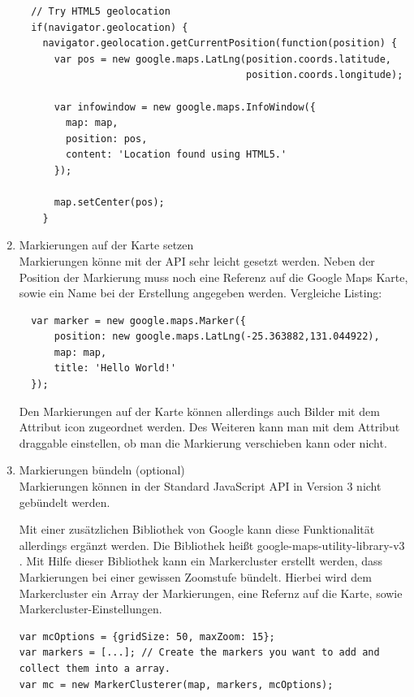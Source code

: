 \begin{enumerate}
\begin{lstlisting}
  // Try HTML5 geolocation
  if(navigator.geolocation) {
    navigator.geolocation.getCurrentPosition(function(position) {
      var pos = new google.maps.LatLng(position.coords.latitude,
                                       position.coords.longitude);

      var infowindow = new google.maps.InfoWindow({
        map: map,
        position: pos,
        content: 'Location found using HTML5.'
      });

      map.setCenter(pos);
    }
\end{lstlisting} \cite[Codebeispiel Geolocation]{googlemaps}

\item Markierungen auf der Karte setzen\\
Markierungen könne mit der API sehr leicht gesetzt werden. Neben der Position der Markierung muss noch eine Referenz auf die Google Maps Karte, sowie ein Name bei der Erstellung angegeben werden. Vergleiche Listing:

\begin{lstlisting}
  var marker = new google.maps.Marker({
      position: new google.maps.LatLng(-25.363882,131.044922),
      map: map,
      title: 'Hello World!'
  });

\end{lstlisting} \cite[Codebeispiel Simple Markers]{googlemaps}

Den Markierungen auf der Karte können allerdings auch Bilder mit dem Attribut \glqq icon \grqq zugeordnet werden. Des Weiteren kann man mit dem Attribut \glqq draggable \grqq einstellen, ob man die Markierung verschieben kann oder nicht.

\item Markierungen bündeln (optional)\\
Markierungen können in der Standard JavaScript API in Version 3 nicht gebündelt werden. 

Mit einer zusätzlichen Bibliothek  von Google kann diese Funktionalität allerdings ergänzt werden. Die Bibliothek heißt \glqq google-maps-utility-library-v3 \grqq. 
Mit Hilfe dieser Bibliothek kann ein \glqq Markercluster \grqq erstellt werden, dass Markierungen bei einer gewissen Zoomstufe bündelt. Hierbei wird dem Markercluster ein Array der Markierungen, eine Refernz auf die Karte, sowie Markercluster-Einstellungen.

\begin{lstlisting}
var mcOptions = {gridSize: 50, maxZoom: 15};
var markers = [...]; // Create the markers you want to add and collect them into a array.
var mc = new MarkerClusterer(map, markers, mcOptions);
\end{lstlisting}
\cite{googlecluster}

\end{enumerate}





